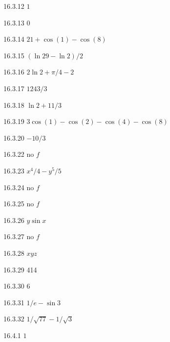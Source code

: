 \begin{Answer}{16.3.12}
	$1$
\end{Answer}
\begin{Answer}{16.3.13}
	$0$
\end{Answer}
\begin{Answer}{16.3.14}
	$21+\cos(1)-\cos(8)$
\end{Answer}
\begin{Answer}{16.3.15}
	$(\ln29-\ln2)/2$
\end{Answer}
\begin{Answer}{16.3.16}
	$2\ln2+\pi/4-2$
\end{Answer}
\begin{Answer}{16.3.17}
	$1243/3$
\end{Answer}
\begin{Answer}{16.3.18}
	$\ln2+11/3$
\end{Answer}
\begin{Answer}{16.3.19}
	$3\cos(1)-\cos(2)-\cos(4)-\cos(8)$
\end{Answer}
\begin{Answer}{16.3.20}
	$-10/3$
\end{Answer}
\begin{Answer}{16.3.22}
	no $f$
\end{Answer}
\begin{Answer}{16.3.23}
	$x^4/4-y^5/5$
\end{Answer}
\begin{Answer}{16.3.24}
	no $f$
\end{Answer}
\begin{Answer}{16.3.25}
	no $f$
\end{Answer}
\begin{Answer}{16.3.26}
	$y\sin x$
\end{Answer}
\begin{Answer}{16.3.27}
	no $f$
\end{Answer}
\begin{Answer}{16.3.28}
	$xyz$
\end{Answer}
\begin{Answer}{16.3.29}
	414
\end{Answer}
\begin{Answer}{16.3.30}
	$6$
\end{Answer}
\begin{Answer}{16.3.31}
	$1/e-\sin3$
\end{Answer}
\begin{Answer}{16.3.32}
	$1/\sqrt{77}-1/\sqrt3$
\end{Answer}
\begin{Answer}{16.4.1}
	$1$
\end{Answer}
